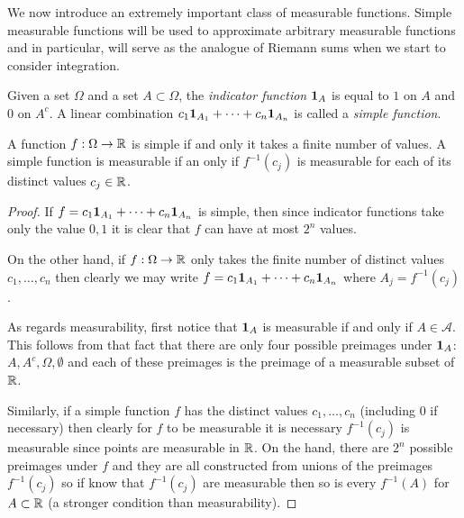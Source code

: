 We now introduce an extremely important class of measurable
functions.  Simple measurable functions will be used to approximate
arbitrary measurable functions and in particular, will serve as the
analogue of Riemann sums when we start to consider integration.

\begin{defn}Given a set $\Omega$ and a set $A
  \subset \Omega$, the \emph{indicator function} $\textbf{1}_{A}$ is
  equal to $1$ on $A$ and $0$ on $A^c$.  A linear combination $c_1
  \textbf{1}_{A_1} + \cdots + c_n \textbf{1}_{A_n}$ is called
  a \emph{simple function}.
\end{defn}

\begin{lem}\label{SimpleFunctions}A function $f : \Omega \to \mathbb{R}$ is simple if and only it
  takes a finite number of values.  A simple function is measurable if
  an only if $f^{-1}(c_j)$ is measurable for each of its distinct
  values $c_j \in \mathbb{R}$.
\end{lem}
\begin{proof}
If $f = c_1  \textbf{1}_{A_1} + \cdots + c_n \textbf{1}_{A_n}$
is simple, then since indicator functions take only the value ${0,1}$
it is clear that $f$ can have at most $2^n$ values.

On the other hand, if $f : \Omega \to \mathbb{R}$ only takes the finite
number of distinct values $c_1, \dots, c_n$ then clearly we may write 
$f = c_1  \textbf{1}_{A_1} + \cdots + c_n \textbf{1}_{A_n}$
where $A_j = f^{-1}(c_j)$.

As regards measurability, first notice that $\textbf{1}_{A}$ is
measurable if and only if $A \in  \mathcal{A}$.  This follows from
that fact that there are only four possible preimages under
$\textbf{1}_{A}$: $A, A^c, \Omega, \emptyset$ and each of these
preimages is the preimage of a measurable subset of $\mathbb{R}$.

Similarly, if a simple function $f$ has the distinct values $c_1, \dots,
c_n$ (including $0$ if necessary) then clearly for $f$ to be
measurable it is necessary $f^{-1}(c_j)$ is measurable since points
are measurable in $\mathbb{R}$.   On the hand, there are $2^n$ possible preimages under $f$ and they are all
constructed from unions of the preimages $f^{-1}(c_j)$ so if know that
$f^{-1}(c_j)$ are measurable then so is every $f^{-1}(A)$ for $A
\subset \mathbb{R}$ (a stronger condition than measurability).
\end{proof}

